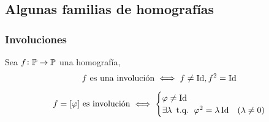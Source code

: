 \subsection{Algunas familias de homografías}

\subsubsection{Involuciones}

\begin{defi}
	Sea $f \colon \mathbb{P} \to \mathbb{P}$ una homografía,
	\[ f\text{ es una involución} \iff f \neq \operatorname{Id}, f^2 = \operatorname{Id} \]
\end{defi}
\begin{obs}
	\[
		f = [\varphi]\text{ es involución} \iff
		\begin{cases}
			\varphi \neq \operatorname{Id}  \\
			\exists\lambda\operatorname{\text{ t.q. }}\varphi^2=\lambda\operatorname{Id} & \left( \lambda \neq 0 \right)
		\end{cases}
	\]
\end{obs}
